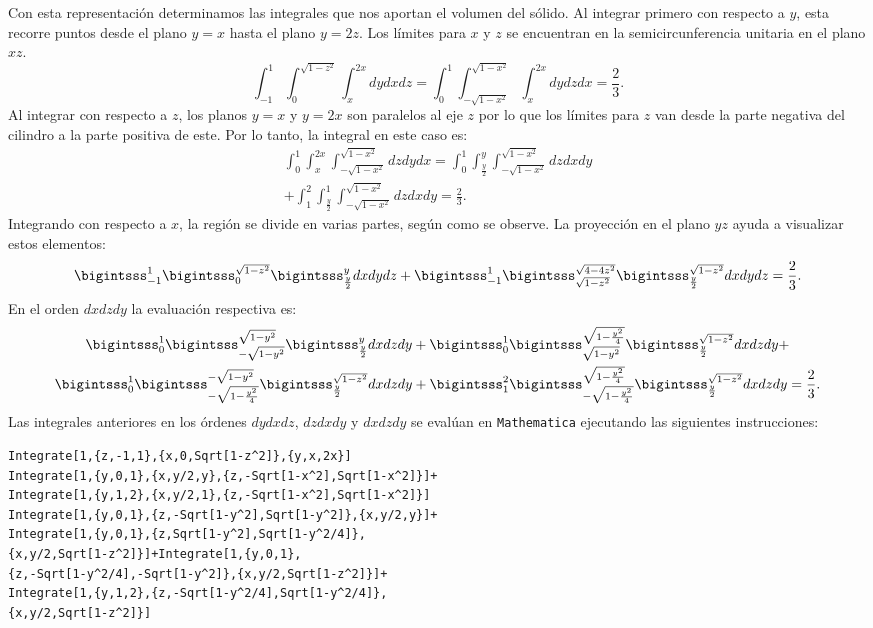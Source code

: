 Con esta representación determinamos las integrales que nos aportan el volumen del sólido. Al integrar primero con respecto a $y$, esta recorre puntos desde el plano $y=x$ hasta el plano $y=2z$. Los límites para $x$ y $z$ se encuentran en la semicircunferencia unitaria en el plano $xz$.
\[\int_{-1}^{1}\int_{0}^{\sqrt{1-z^{2}}}\int_{x}^{2x}dydxdz= \int_{0}^{1}\int_{-\sqrt{1-x^{2}}}^{\sqrt{1-x^{2}}}\int_{x}^{2x}dydzdx= \frac{2}{3}.\]
Al integrar con respecto a $z$, los planos $y=x$ y $y=2x$ son paralelos al eje $z$ por lo que los límites para $z$ van desde la parte negativa del cilindro a la parte positiva de este. Por lo tanto, la integral en este caso es:
\begin{multline*} \int_{0}^{1}\int_{x}^{2x}\int_{-\sqrt{1-x^{2}}}^{\sqrt{1-x^{2}}}dzdydx= \int_{0}^{1}\int_{\frac{y}{2}}^{y}\int_{-\sqrt{1-x^{2}}}^{\sqrt{1-x^{2}}}dzdxdy \\ +\int_{1}^2\int_{\frac{y}{2}}^{1}\int_{-\sqrt{1-x^{2}}}^{\sqrt{1-x^{2}}}dzdxdy= \frac{2}{3}.
\end{multline*}
Integrando con respecto a $x$, la región se divide en varias partes, según como se observe. La proyección en el plano $yz$ ayuda a visualizar estos elementos:
\begin{gather*}
\bigintsss_{-1}^{1}\bigintsss_{0}^{\sqrt{1-z^{2}}}\bigintsss_{\frac{y}{2}}^{y}dxdydz+\bigintsss_{-1}^{1}\bigintsss_{\sqrt{1-z^{2}}}^{\sqrt{4-4z^{2}}}\bigintsss_{\frac{y}{2}}^{\sqrt{1-z^{2}}}dxdydz= \frac{2}{3}.
\end{gather*}
En el orden $dxdzdy$ la evaluación respectiva es:
\begin{gather*}
\bigintsss_{0}^{1}\bigintsss_{-\sqrt{1-y^{2}}}^{\sqrt{1-y^{2}}}\bigintsss_{\frac{y}{2}}^{y}dxdzdy+\bigintsss_{0}^{1}\bigintsss_{\sqrt{1-y^{2}}}^{\sqrt{1-\frac{y^{2}}{4}}}\bigintsss_{\frac{y}{2}}^{\sqrt{1-z^{2}}}dxdzdy +\\
\bigintsss_{0}^{1}\bigintsss_{-\sqrt{1-\frac{y^{2}}{4}}}^{-\sqrt{1-y^{2}}}\bigintsss_{\frac{y}{2}}^{\sqrt{1-z^{2}}}dxdzdy+\bigintsss_{1}^2\bigintsss_{-\sqrt{1-\frac{y^{2}}{4}}}^{\sqrt{1-\frac{y^{2}}{4}}}\bigintsss_{\frac{y}{2}}^{\sqrt{1-z^{2}}}dxdzdy= \frac{2}{3}.
\end{gather*}
Las integrales anteriores en los órdenes $dydxdz$, $dzdxdy$ y $dxdzdy$ se evalúan en \verb"Mathematica" ejecutando las siguientes instrucciones:

\begin{tcolorbox}[title=\bf Instrucción en \verb"Mathematica"]\begin{Verbatim}[formatcom=\letraverbatim]
Integrate[1,{z,-1,1},{x,0,Sqrt[1-z^2]},{y,x,2x}]
Integrate[1,{y,0,1},{x,y/2,y},{z,-Sqrt[1-x^2],Sqrt[1-x^2]}]+
Integrate[1,{y,1,2},{x,y/2,1},{z,-Sqrt[1-x^2],Sqrt[1-x^2]}]
Integrate[1,{y,0,1},{z,-Sqrt[1-y^2],Sqrt[1-y^2]},{x,y/2,y}]+
Integrate[1,{y,0,1},{z,Sqrt[1-y^2],Sqrt[1-y^2/4]},
{x,y/2,Sqrt[1-z^2]}]+Integrate[1,{y,0,1},
{z,-Sqrt[1-y^2/4],-Sqrt[1-y^2]},{x,y/2,Sqrt[1-z^2]}]+
Integrate[1,{y,1,2},{z,-Sqrt[1-y^2/4],Sqrt[1-y^2/4]},
{x,y/2,Sqrt[1-z^2]}]
\end{Verbatim}
\end{tcolorbox}

